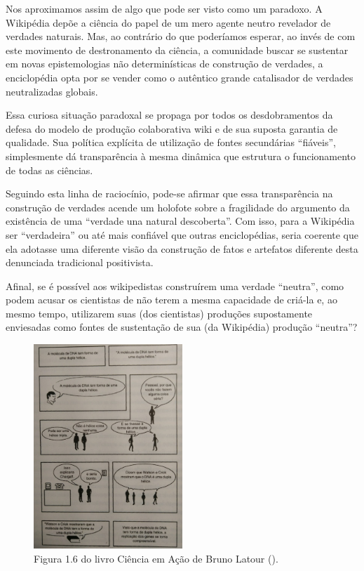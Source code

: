 Nos aproximamos assim de algo que pode ser visto como um paradoxo. A Wikipédia depõe a ciência do papel de um mero agente neutro revelador de verdades naturais. Mas, ao contrário do que poderíamos esperar, ao invés de com este movimento de destronamento da ciência, a comunidade buscar se sustentar em novas epistemologias não determinísticas de construção de verdades, a enciclopédia opta por se vender como o autêntico grande catalisador de verdades neutralizadas globais.

Essa curiosa situação paradoxal se propaga por todos os desdobramentos da defesa do modelo de produção colaborativa wiki e de sua suposta garantia de qualidade. Sua política explícita de utilização de fontes secundárias ``fiáveis'', simplesmente dá transparência à mesma dinâmica que estrutura o funcionamento de todas as ciências.

Seguindo esta linha de raciocínio, pode-se afirmar que essa transparência na construção de verdades acende um holofote sobre a fragilidade do argumento da existência de uma ``verdade una natural descoberta''. Com isso, para a Wikipédia ser ``verdadeira'' ou até mais confiável que outras enciclopédias, seria coerente que ela adotasse uma diferente visão da construção de fatos e artefatos diferente desta denunciada tradicional positivista.

Afinal, se é possível aos wikipedistas construírem uma verdade ``neutra'', como podem acusar os cientistas de não terem a mesma capacidade de criá-la e, ao mesmo tempo, utilizarem suas (dos cientistas) produções supostamente enviesadas como fontes de sustentação de sua (da Wikipédia) produção ``neutra''? 

\begin{figure}[H]
    \centering
    \includegraphics[width=0.5\textwidth]{Images/livro_ciencia_em_acao.png}
    \caption{Figura 1.6 do livro Ciência em Ação de Bruno Latour (\citeyear[p. 22]{latour_ciencia_1987}).}
    \label{fig:livro_ciencia_em_acao}
\end{figure}

